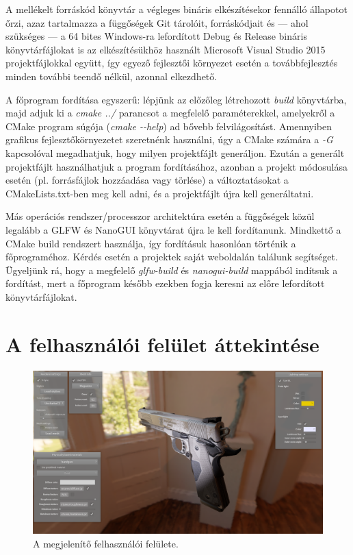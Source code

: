 A mellékelt forráskód könyvtár a végleges bináris elkészítésekor fennálló állapotot őrzi, azaz tartalmazza a függőségek Git tárolóit, forráskódjait és --- ahol szükséges --- a 64 bites Windows-ra lefordított Debug és Release bináris könyvtárfájlokat is az elkészítésükhöz használt Microsoft Visual Studio 2015 projektfájlokkal együtt, így egyező fejlesztői környezet esetén a továbbfejlesztés minden további teendő nélkül, azonnal elkezdhető.

A főprogram fordítása egyszerű: lépjünk az előzőleg létrehozott \textit{build} könyvtárba, majd adjuk ki a \textit{cmake ../} parancsot a megfelelő paraméterekkel, amelyekről a CMake program súgója (\textit{cmake -{}-help}) ad bővebb felvilágosítást. Amennyiben grafikus fejlesztőkörnyezetet szeretnénk használni, úgy a CMake számára a \textit{-G} kapcsolóval megadhatjuk, hogy milyen projektfájlt generáljon. Ezután a generált projektfájlt használhatjuk a program fordításához, azonban a projekt módosulása esetén (pl. forrásfájlok hozzáadása vagy törlése) a változtatásokat a CMakeLists.txt-ben meg kell adni, és a projektfájlt újra kell generáltatni.

Más operációs rendszer/processzor architektúra esetén a függőségek közül legalább a GLFW és NanoGUI könyvtárat újra le kell fordítanunk. Mindkettő a CMake build rendszert használja, így fordításuk hasonlóan történik a főprograméhoz. Kérdés esetén a projektek saját weboldalán találunk segítséget. Ügyeljünk rá, hogy a megfelelő \textit{glfw-build} és \textit{nanogui-build} mappából indítsuk a fordítást, mert a főprogram később ezekben fogja keresni az előre lefordított könyvtárfájlokat.

\section{A felhasználói felület áttekintése}

\begin{figure}[!ht]
    \centering
    \includegraphics[width=1.0\textwidth]{images/screenshot.png}
    \caption{A megjelenítő felhasználói felülete.}
\end{figure}

